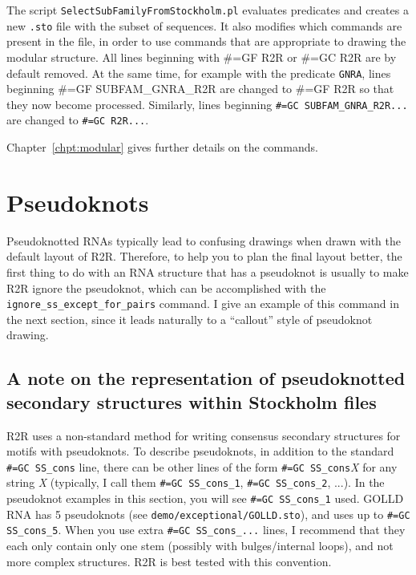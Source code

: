 \documentclass[letterpaper,12pt]{report}
\newcommand{\comment}[1]{}
\begin{document}
The script {\tt SelectSubFamilyFromStockholm.pl} evaluates predicates and creates a new {\tt .sto} file with the subset
of sequences.  It also modifies which commands are present in the file, in order to use commands that are appropriate
to drawing the modular structure.
All lines beginning with {\#=GF R2R} or {\#=GC R2R} are by default removed.
At the same time, for example with the predicate {\tt GNRA}, lines beginning {\#=GF SUBFAM\_GNRA\_R2R}
are changed to {\#=GF R2R} so that they now become processed.
Similarly, lines beginning {\tt \#=GC SUBFAM\_GNRA\_R2R...} are changed to {\tt \#=GC R2R...}.

Chapter~\ref{chpt:modular} gives further details on the commands.

\comment{
In this section, I will demonstrate the drawing of modular structures using c4 antisense RNA \cite{c4,Weinberg104Motifs}.
A number of terminal loops of hairpins have been demonstrated that are especially stable.
The GNRA tetraloop is the best known of these, but UNCG and CUNG are also established as stable terminal loops.
The terminal loop of the P2 hairpin in the c4 antisense RNA often conforms to one of these stable tetraloops, 
and I want to show how frequent
each of them were.
}

\section{Pseudoknots}

Pseudoknotted RNAs typically lead to confusing drawings when drawn with the default layout of R2R.
Therefore, to help you to plan the final layout better,
the first thing to do with an RNA structure that has a pseudoknot is usually to make R2R ignore the pseudoknot,
which can be accomplished with the {\tt ignore\_ss\_except\_for\_pairs} command.
I give an example of this command in the next section, since it leads naturally to a ``callout'' style of pseudoknot drawing.

\subsection{A note on the representation of pseudoknotted secondary structures within Stockholm files}

R2R uses a non-standard method for writing consensus secondary structures for motifs with pseudoknots.
To describe pseudoknots, in addition to the standard {\tt \#=GC SS\_cons} line, there can be other lines
of the form {\tt \#=GC SS\_cons}{\it X} for any string {\it X} (typically, I call them
{\tt \#=GC SS\_cons\_1}, {\tt \#=GC SS\_cons\_2}, ...).  
In the pseudoknot examples in this section, you will see {\tt \#=GC SS\_cons\_1} used.
GOLLD RNA \cite{CoolRNAs} has 5 pseudoknots (see {\tt demo/exceptional/GOLLD.sto}), and uses up to {\tt \#=GC SS\_cons\_5}.
When you use extra {\tt \#=GC SS\_cons\_...} lines, I recommend that they each only contain only one stem (possibly with bulges/internal loops), and
not more complex structures.  R2R is best tested with this convention.
\end{document}
